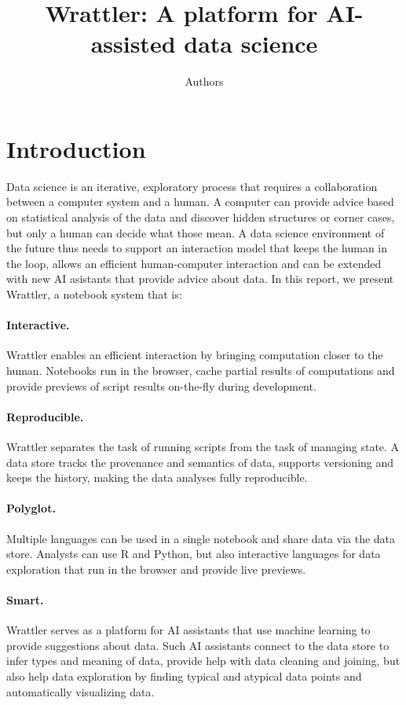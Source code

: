 \documentclass[sigplan,preprint,10pt]{acmart}\settopmatter{printfolios=true,printccs=false,printacmref=false}
\title{Wrattler: \textnormal{A platform for AI-assisted data science}}
\author{Authors}
\theoremstyle{plain}
\theoremstyle{definition}
\begin{document}
\maketitle

\section{Introduction}
Data science is an iterative, exploratory process that requires a collaboration between a 
computer system and a human. A computer can provide advice 
based on statistical analysis of the data and discover hidden structures or corner cases, but only
a human can decide what those mean.
A data science environment of the future thus needs to support an interaction model that 
keeps the human in the loop, allows an efficient human-computer interaction 
and can be extended with new AI asistants that provide advice about data.
In this report, we present Wrattler, a notebook system that is:

\paragraph{Interactive.}
Wrattler enables an efficient interaction by bringing computation closer to the human.
Notebooks run in the browser, cache partial results of computations and provide previews
of script results on-the-fly during development.

\paragraph{Reproducible.} 
Wrattler separates the task of running scripts from the task of managing state.
A data store tracks the provenance and semantics of data, supports versioning and keeps 
the history, making the data analyses fully reproducible.

\paragraph{Polyglot.}
Multiple languages can be used in a single notebook and share data via the data store.
Analysts can use R and Python, but also interactive languages for data exploration
that run in the browser and provide live previews.

\paragraph{Smart.}
Wrattler serves as a platform for AI assistants that use machine learning to provide suggestions 
about data. Such AI assistants connect to the data store to infer types and meaning of data, provide 
help with data cleaning and joining, but also help data exploration by finding typical and atypical 
data points and automatically visualizing data.
\end{document}
